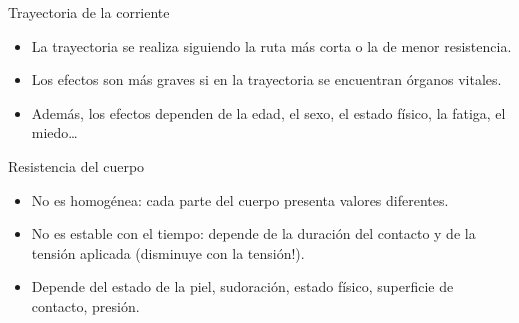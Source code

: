 \documentclass[xcolor={usenames,svgnames,dvipsnames}]{beamer}
\begin{document}
\begin{frame}[label={sec:orgabcaf41}]{Trayectoria de la corriente}
\begin{itemize}
\item La trayectoria se realiza siguiendo la ruta más corta o la de menor
resistencia.

\item Los efectos son más graves si en la trayectoria se encuentran órganos
vitales.

\item Además, los efectos dependen de la edad, el sexo, el estado físico,
la fatiga, el miedo\ldots{}
\end{itemize}
\end{frame}

\begin{frame}[label={sec:org78a97a9}]{Resistencia del cuerpo}
\begin{itemize}
\item \alert{No es homogénea}: cada parte del cuerpo presenta valores diferentes.

\item \alert{No es estable con el tiempo}: depende de la duración del contacto
y de la tensión aplicada (disminuye con la tensión!).

\item Depende del estado de la piel, sudoración, estado físico, superficie
de contacto, presión.
\end{itemize}
\end{frame}
\end{document}
